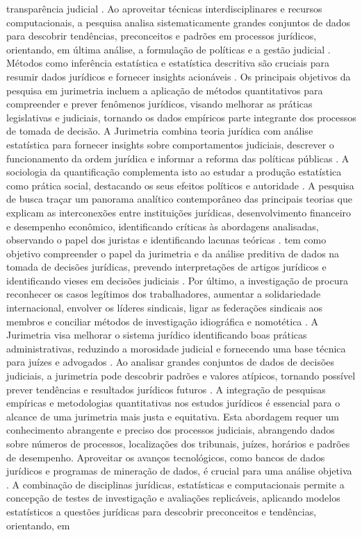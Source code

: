 transparência judicial \cite{massuanganhe2016, nunes2018, silva2023}. Ao aproveitar técnicas interdisciplinares e recursos computacionais, a pesquisa analisa sistematicamente grandes conjuntos de dados para descobrir tendências, preconceitos e padrões em processos jurídicos, orientando, em última análise, a formulação de políticas e a gestão judicial \cite{machado2017, de2010, ribeiro2021}. Métodos como inferência estatística e estatística descritiva são cruciais para resumir dados jurídicos e fornecer insights acionáveis \cite{massuanganhe2016, zabala2019}. Os principais objetivos da pesquisa em jurimetria incluem a aplicação de métodos quantitativos para compreender e prever fenômenos jurídicos, visando melhorar as práticas legislativas e judiciais, tornando os dados empíricos parte integrante dos processos de tomada de decisão. A Jurimetria combina teoria jurídica com análise estatística para fornecer insights sobre comportamentos judiciais, descrever o funcionamento da ordem jurídica e informar a reforma das políticas públicas \cite{nunes2018, nunes2018, nunes2018, de2010}. A sociologia da quantificação complementa isto ao estudar a produção estatística como prática social, destacando os seus efeitos políticos e autoridade \cite{paiva2021}. A pesquisa de \cite{borges2015} busca traçar um panorama analítico contemporâneo das principais teorias que explicam as interconexões entre instituições jurídicas, desenvolvimento financeiro e desempenho econômico, identificando críticas às abordagens analisadas, observando o papel dos juristas e identificando lacunas teóricas \cite {borges2015}. \cite{Silva2023} tem como objetivo compreender o papel da jurimetria e da análise preditiva de dados na tomada de decisões jurídicas, prevendo interpretações de artigos jurídicos e identificando vieses em decisões judiciais \cite{silva2023,silva2023}. Por último, a investigação de \cite{turnbull2022} procura reconhecer os casos legítimos dos trabalhadores, aumentar a solidariedade internacional, envolver os líderes sindicais, ligar as federações sindicais aos membros e conciliar métodos de investigação idiográfica e nomotética \cite{turnbull2022}. A Jurimetria visa melhorar o sistema jurídico identificando boas práticas administrativas, reduzindo a morosidade judicial e fornecendo uma base técnica para juízes e advogados \cite{silva2023role}. Ao analisar grandes conjuntos de dados de decisões judiciais, a jurimetria pode descobrir padrões e valores atípicos, tornando possível prever tendências e resultados jurídicos futuros \cite{silva2023role}. A integração de pesquisas empíricas e metodologias quantitativas nos estudos jurídicos é essencial para o alcance de uma jurimetria mais justa e equitativa. Esta abordagem requer um conhecimento abrangente e preciso dos processos judiciais, abrangendo dados sobre números de processos, localizações dos tribunais, juízes, horários e padrões de desempenho. Aproveitar os avanços tecnológicos, como bancos de dados jurídicos e programas de mineração de dados, é crucial para uma análise objetiva \cite{nunes2018}. A combinação de disciplinas jurídicas, estatísticas e computacionais permite a concepção de testes de investigação e avaliações replicáveis, aplicando modelos estatísticos a questões jurídicas para descobrir preconceitos e tendências, orientando, em 